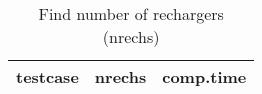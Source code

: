 \documentclass{article}
\begin{document}
\begin{table}[h!]
  \begin{center}
    \caption{Find number of rechargers (nrechs)}
    \label{tab:table1}
    \begin{tabular}{l|c|r}
      \textbf{testcase} & \textbf{nrechs} & \textbf{comp.time}\\
      \hline
    \end{tabular}
  \end{center}
\end{table}
\end{document}
